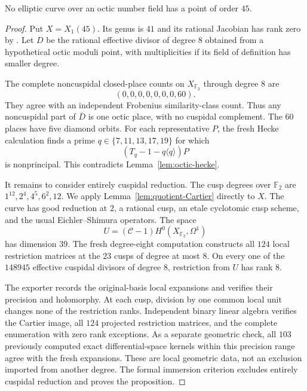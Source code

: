\begin{proposition}\label{prop:octic45}
No elliptic curve over an octic number field has a point of order $45$.
\end{proposition}
\begin{proof}
Put $X=X_1(45)$. Its genus is $41$ and its rational Jacobian has rank
zero by \cite[Theorem~3.1(2)]{DEHMZ}. Let $D$ be the rational effective
divisor of degree $8$ obtained from a hypothetical octic moduli point,
with multiplicities if its field of definition has smaller degree.

The complete noncuspidal closed-place counts on $X_{\mathbb F_2}$
through degree $8$ are
\[
 (0,0,0,0,0,0,0,60).
\]
They agree with an independent Frobenius similarity-class count.
Thus any noncuspidal part of $\overline D$ is one octic place, with
no cuspidal complement. The $60$ places have five diamond orbits.
For each representative $P$, the fresh Hecke calculation finds a
prime $q\in\{7,11,13,17,19\}$ for which
\[
 (T_q-1-q\langle q\rangle)P
\]
is nonprincipal. This contradicts Lemma~\ref{lem:octic-hecke}.

It remains to consider entirely cuspidal reduction. The cusp degrees
over $\mathbb F_2$ are $1^{12},2^4,4^5,6^2,12$.
We apply Lemma~\ref{lem:quotient-Cartier} directly to $X$.
The curve has good reduction at $2$, a rational cusp, an etale
cyclotomic cusp scheme, and the usual Eichler--Shimura operators.
The space
\[
 U=(\mathcal C-1)H^0(X_{\mathbb F_2},\Omega^1)
\]
has dimension $39$. The fresh degree-eight computation constructs all
$124$ local restriction matrices at the $23$ cusps of degree at most
$8$. On every one of the $148945$ effective cuspidal divisors of
degree $8$, restriction from $U$ has rank $8$.

The exporter records the original-basis local expansions and verifies
their precision and holomorphy. At each cusp, division by one common
local unit changes none of the restriction ranks. Independent binary
linear algebra verifies the Cartier image, all $124$ projected
restriction matrices, and the complete enumeration with zero rank
exceptions. As a separate geometric check, all $103$ previously
computed exact differential-space kernels within this precision
range agree with the fresh expansions. These are local geometric
data, not an exclusion imported from another degree. The formal
immersion criterion excludes entirely cuspidal reduction and proves
the proposition.
\end{proof}
